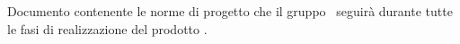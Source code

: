 Documento contenente le norme di progetto che il gruppo \gruppo\ seguirà durante tutte le fasi di realizzazione del prodotto \progetto.
